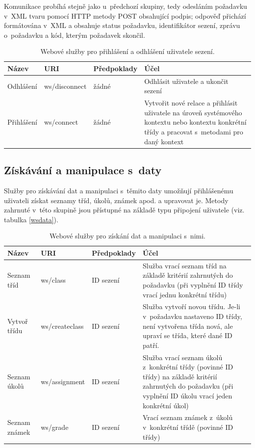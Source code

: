 \documentclass[
print,
  11pt,
  table,   
  nolof,    
  nolot,
  oneside,
  draft
]{fithesis3}
\begin{document}
Komunikace probíhá stejně jako u~předchozí skupiny, tedy odesláním požadavku v~XML tvaru pomocí HTTP metody POST obsahující podpis; odpověď přichází formátována v~XML a obsahuje status požadavku, identifikátor sezení, zprávu o~požadavku a kód, kterým požadavek skončil.

\begin{table}[htb]
\begin{tabularx}{\textwidth}{|l|l|l|Y|}
\hline
\textbf{Název} & \textbf{URI} & \textbf{Předpoklady}  & \textbf{Účel}  \\
\hline
Odhlášení & ws/disconnect &  žádné & Odhlásit uživatele a ukončit sezení \\
\hline
Přihlášení &  ws/connect & žádné& Vytvořit nové relace a přihlásit uživatele na úroveň systémového kontextu nebo kontextu konkrétní třídy a pracovat s~metodami pro daný kontext\\
\hline
\end{tabularx}
\caption{Webové služby pro přihlášení a odhlášení uživatele sezení.}
  \label{tab:wsconnect}
\end{table}



		\subsection{Získávání a manipulace s~daty}
Služby pro získávání dat a manipulaci s~těmito daty umožňují přihlášenému uživateli získat seznamy tříd, úkolů, známek apod. a upravovat je. Metody zahrnuté v~této skupině jsou přístupné na základě typu připojení uživatele (viz. tabulka \ref{wsdata}).
\begin{table}[htbp]
\begin{tabularx}{\textwidth}{|l|l|l|Y|}
\hline
\textbf{Název} & \textbf{URI} & \textbf{Předpoklady}  & \textbf{Účel}  \\
\hline
Seznam tříd & ws/class & ID sezení & Služba vrací seznam tříd na základě kritérií zahrnutých do požadavku (při vyplnění ID třídy vrací jednu konkrétní třídu) \\
\hline
Vytvoř třídu & ws/createclass & ID sezení & Služba vytvoří novou třídu. Je-li v~požadavku nastaveno ID třídy, není vytvořena třída nová, ale upraví se třída, které dané ID patří. \\
\hline
Seznam úkolů & ws/assignment & ID sezení & Služba vrací seznam úkolů z~konkrétní třídy (povinné ID třídy) na základě kritérií zahrnutých do požadavku (při vyplnění ID úkolu vrací jeden konkrétní úkol) \\
\hline
Seznam známek & ws/grade & ID sezení & Vrací seznam známek z~úkolů v~konkrétní třídě (povinné ID třídy) \\

\hline
\end{tabularx}
\caption{Webové služby pro získání dat a manipulaci s~nimi.}
  \label{tab:wsdata}
\end{table}
\end{document}
